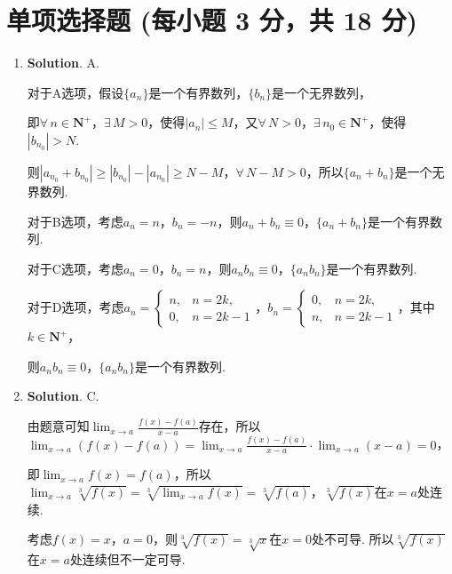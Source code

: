 \documentclass[../Main.tex]{subfiles}
\begin{document}
\section{单项选择题 (每小题 3 分，共 18 分)}
\begin{enumerate}
    \item \textbf{Solution}. A.

          对于A选项，假设$\{a_{n}\}$是一个有界数列，$\{b_{n}\}$是一个无界数列，

          即$\forall\,n\in\mathbf{N}^{+}$，$\exists\,M>0$，使得$|a_{n}|\leq M$，又$\forall
              \,N>0$，$\exists\,n_{0}\in\mathbf{N}^{+}$，使得$|b_{n_0}|>N$.

          则$|a_{n_0}+b_{n_0}|\geq |b_{n_0}|-|a_{n_0}|\geq N-M$，$\forall\,N-M>0$，所以$\{
              a_{n}+b_{n}\}$是一个无界数列.

          对于B选项，考虑$a_{n}= n$，$b_{n}=-n$，则$a_{n}+b_{n}\equiv 0$，$\{a_{n}+b_{n}
              \}$是一个有界数列.

          对于C选项，考虑$a_{n}=0$，$b_{n}=n$，则$a_{n}b_{n}\equiv 0$，$\{a_{n}b_{n}\}$是一个有界数列.

          对于D选项，考虑$a_{n}=
              \begin{cases}
                  n, & n=2k,  \\
                  0, & n=2k-1
              \end{cases}$，$b_{n}=
              \begin{cases}
                  0, & n=2k,  \\
                  n, & n=2k-1
              \end{cases}$，其中$k\in\mathbf{N}^{+}$，

          则$a_{n}b_{n}\equiv 0$，$\{a_{n}b_{n}\}$是一个有界数列.

    \item \textbf{Solution}. C.

          由题意可知$\lim_{x\to a}\frac{f(x)-f(a)}{x-a}$存在，所以$\lim_{x\to a}\left
              (f(x)-f(a)\right)=\lim_{x\to a}\frac{f(x)-f(a)}{x-a}\cdot \lim_{x\to a}(x-a
              )=0$，

          即$\lim_{x\to a}f(x)=f(a)$，所以$\lim_{x\to a}\sqrt[3]{f(x)}=\sqrt[3]{\lim_{x\to
                      a}f(x)}=\sqrt[3]{f(a)}$，$\sqrt[3]{f(x)}$在$x=a$处连续.

          考虑$f(x)=x$，$a=0$，则$\sqrt[3]{f(x)}=\sqrt[3]{x}$在$x=0$处不可导. 所以$\sqrt[3]{f(x)}$在$x
              =a$处连续但不一定可导.


\end{enumerate}
\end{document}
